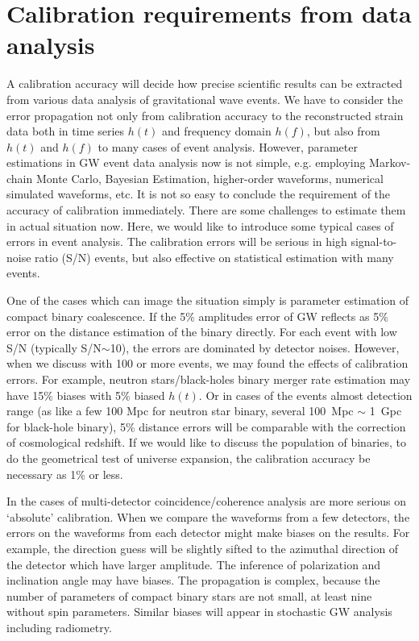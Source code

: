 
\section{Calibration requirements from data analysis}

A calibration accuracy will decide how precise scientific results can be extracted from various data 
analysis of gravitational wave events. We have to consider the error propagation not only from 
calibration accuracy to the reconstructed strain data both in time series $h(t)$ and frequency 
domain $h(f)$, but also from $h(t)$ and $h(f)$ to many cases of event analysis. However, parameter 
estimations in GW event data analysis now is not simple, e.g. employing Markov-chain Monte Carlo, 
Bayesian Estimation, higher-order waveforms, numerical simulated waveforms, etc. It is not so easy 
to conclude the requirement of the accuracy of calibration immediately. There are some challenges to 
estimate them in actual situation now. Here, we would like to introduce some typical cases of errors 
in event analysis. The calibration errors will be serious in high signal-to-noise ratio (S/N) 
events, but also effective on statistical estimation with many events.

One of the cases which can image the situation simply is parameter estimation of compact binary 
coalescence. If the 5\% amplitudes error of GW reflects as 5\% error on the distance estimation of 
the binary directly. For each event with low S/N (typically S/N$\sim$10), the errors are dominated by 
detector noises. However, when we discuss with 100 or more events, we may found the effects of 
calibration errors. For example, neutron stars/black-holes binary merger rate estimation may have 
15\% biases with 5\% biased $h(t)$. Or in cases of the events almost detection range (as like a few 
100 Mpc for neutron star binary, several 100~Mpc $\sim$ 1~Gpc for black-hole binary), 5\% distance 
errors will be comparable with the correction of cosmological redshift. If we would like to discuss 
the population of binaries, to do the geometrical test of universe expansion, the calibration 
accuracy be necessary as 1\% or less.

In the cases of multi-detector coincidence/coherence analysis are more serious on `absolute' 
calibration. When we compare the waveforms from a few detectors, the errors on the waveforms from 
each detector might make biases on the results. For example, the direction guess will be slightly 
sifted to the azimuthal direction of the detector which have larger amplitude. The inference of 
polarization and inclination angle may have biases. The propagation is complex, because the number of
parameters of compact binary stars are not small, at least nine without spin parameters. Similar 
biases will appear in stochastic GW analysis including radiometry.

